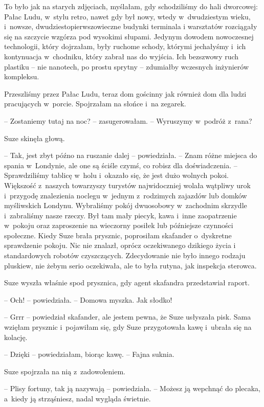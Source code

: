\documentclass[oneside,polish,11pt,sfheadings]{mwbk}
\begin{document}
To było jak na starych zdjęciach, myślałam, gdy schodziliśmy do hali
dworcowej: Pałac Ludu, w~stylu retro, nawet gdy był nowy, wtedy w~dwudziestym wieku, i~nowsze, dwudziestopierwszowieczne budynki terminala
i warsztatów rozciągały się na szczycie wzgórza pod wysokimi słupami.
Jedynym dowodem nowoczesnej technologii, który dojrzałam, były ruchome
schody, którymi jechałyśmy i~ich kontynuacja w~chodniku, który zabrał
nas do wyjścia. Ich bezszwowy ruch plastiku -- nie nanotech, po prostu
sprytny -- zdumiałby wczesnych inżynierów kompleksu.

Przeszliśmy przez Pałac Ludu, teraz dom gościnny jak również dom dla
ludzi pracujących w~porcie. Spojrzałam na słońce i~na zegarek.

-- Zostaniemy tutaj na noc? -- zasugerowałam. -- Wyruszymy w~podróż z~rana?

Suze skinęła głową. 

-- Tak, jest zbyt późno na ruszanie dalej -- powiedziała. -- Znam różne miejsca do spania w~Londynie, ale one są
ściśle czymś, co robisz dla doświadczenia. -- Sprawdziliśmy tablicę w~holu i~okazało się, że jest dużo wolnych pokoi. Większość z~naszych
towarzyszy turystów najwidoczniej wolała wątpliwy urok i~przygodę
znalezienia noclegu w~jednym z~rodzimych zajazdów lub domków myśliwskich
Londynu. Wybraliśmy pokój dwuosobowy w~zachodnim skrzydle i~zabraliśmy
nasze rzeczy. Był tam mały piecyk, kawa i~inne zaopatrzenie w~pokoju
oraz zaproszenie na wieczorny posiłek lub późniejsze czynności
społeczne. Kiedy Suze brała prysznic, poprosiłam skafander o~dyskretne
sprawdzenie pokoju. Nic nie znalazł, oprócz oczekiwanego dzikiego życia
i standardowych robotów czyszczących. Zdecydowanie nie było innego
rodzaju pluskiew, nie żebym serio oczekiwała, ale to była rutyna, jak
inspekcja sterowca.

Suze wyszła właśnie spod prysznica, gdy agent skafandra przedstawiał
raport.

-- Och! -- powiedziała. -- Domowa myszka. Jak słodko!

-- Grrr -- powiedział skafander, ale jestem pewna, że Suze usłyszała pisk.
Sama wzięłam prysznic i~pojawiłam się, gdy Suze przygotowała kawę i~ubrała się na kolację.

-- Dzięki -- powiedziałam, biorąc kawę. -- Fajna suknia.

Suze spojrzała na nią z~zadowoleniem. 

-- Plisy fortuny, tak ją nazywają -- powiedziała. -- Możesz ją wepchnąć do plecaka, a~kiedy ją strząśniesz,
nadal wygląda świetnie.
\end{document}
